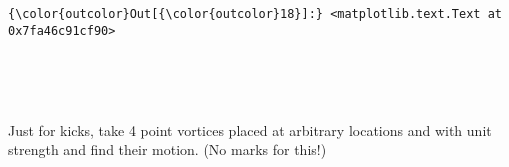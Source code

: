 \documentclass[11pt]{article}
\begin{document}
            \begin{Verbatim}[commandchars=\\\{\}]
{\color{outcolor}Out[{\color{outcolor}18}]:} <matplotlib.text.Text at 0x7fa46c91cf90>
\end{Verbatim}
        
    \begin{center}
    \end{center}
    { \hspace*{\fill} \\}
    
    \begin{center}
    \end{center}
    { \hspace*{\fill} \\}
    
    Just for kicks, take 4 point vortices placed at arbitrary locations and
with unit strength and find their motion. (No marks for this!)
\end{document}
